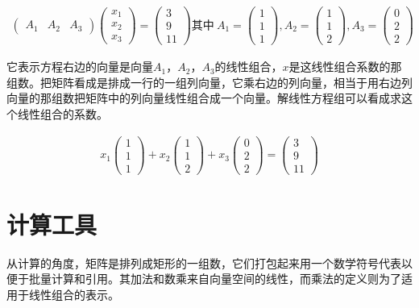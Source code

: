 \begin{gather*}
	\begin{pmatrix}
		A_1&A_2&A_3
	\end{pmatrix}
	\begin{pmatrix}
		x_1\\x_2\\x_3
	\end{pmatrix}=
	\begin{pmatrix}
		3\\9\\11
	\end{pmatrix}
	\mbox{其中} \ 
	A_1 = \begin{pmatrix}
		1\\1\\1
	\end{pmatrix},
	A_2 = \begin{pmatrix}
		1\\1\\2
	\end{pmatrix},
	A_3 = \begin{pmatrix}
		0\\2\\2
	\end{pmatrix}
\end{gather*}

它表示方程右边的向量是向量$ A_1，A_2，A_3 $的线性组合，$ x $是这线性组合系数的那组数。把矩阵看成是排成一行的一组列向量，它乘右边的列向量，相当于用右边列向量的那组数把矩阵中的列向量线性组合成一个向量。解线性方程组可以看成求这个线性组合的系数。

\begin{gather*}
	x_1 \begin{pmatrix}
		1\\1\\1
	\end{pmatrix}+
	x_2 \begin{pmatrix}
		1\\1\\2
	\end{pmatrix}+
	x_3 \begin{pmatrix}
		0\\2\\2
	\end{pmatrix}=
	\begin{pmatrix}
		3\\9\\11
	\end{pmatrix}		
\end{gather*}

\section{计算工具}
从计算的角度，矩阵是排列成矩形的一组数，它们打包起来用一个数学符号代表以便于批量计算和引用。其加法和数乘来自向量空间的线性，而乘法的定义则为了适用于线性组合的表示。

